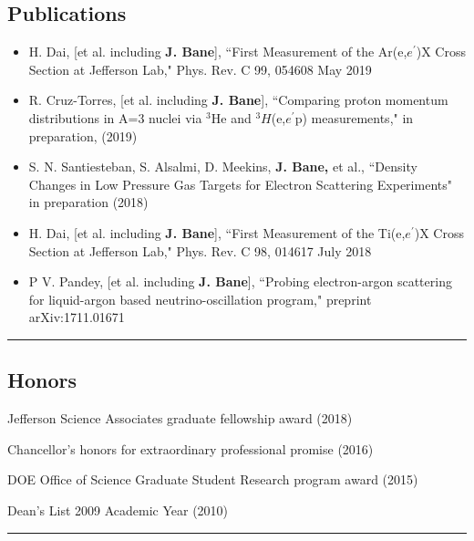 \documentclass[12pt,letterpaper]{article}
\begin{document}
\subsection*{Publications}
\begin{itemize} \itemsep -2pt %
	\item  H. Dai, [et al. including \textbf{J. Bane}], ``First Measurement of the Ar(e,$e^\prime$)X Cross Section at Jefferson Lab," Phys. Rev. C 99, 054608 May 2019
	\item R. Cruz-Torres, [et al. including \textbf{J. Bane}], ``Comparing proton momentum distributions in A=3 nuclei via $^3$He and $^3H$(e,$e^\prime$p) measurements," in preparation, (2019)
	\item S. N. Santiesteban, S. Alsalmi, D. Meekins, \textbf{J. Bane,} et al., ``Density Changes in Low Pressure Gas Targets for Electron Scattering Experiments" in preparation (2018) 
	
	\item  H. Dai, [et al. including \textbf{J. Bane}], ``First Measurement of the Ti(e,$e^\prime$)X Cross Section at Jefferson Lab," Phys. Rev. C 98, 014617 July 2018
	\item P V. Pandey, [et al. including \textbf{J. Bane}], ``Probing electron-argon scattering for liquid-argon based neutrino-oscillation program," preprint arXiv:1711.01671
	
\end{itemize}
\hrule
\subsection*{Honors}
	\begin{itemize*}
		\item Jefferson Science Associates graduate fellowship award (2018)  
		\item Chancellor’s honors for extraordinary professional promise (2016) 
		\item DOE Office of Science Graduate Student Research program award (2015)
		\item Dean's List 2009 Academic Year (2010)
	\end{itemize*}
\hrule
\end{document}

